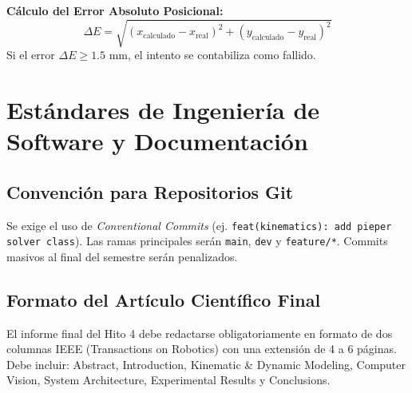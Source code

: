 \documentclass[11pt,a4paper]{article}
\begin{document}
\vspace{0.3cm}
\begin{center}
\end{center}

\vspace{0.3cm}
\noindent \textbf{Cálculo del Error Absoluto Posicional:}
$$ \Delta E = \sqrt{(x_{\text{calculado}} - x_{\text{real}})^2 + (y_{\text{calculado}} - y_{\text{real}})^2} $$
Si el error $\Delta E \ge 1.5\text{ mm}$, el intento se contabiliza como fallido.

\section{Estándares de Ingeniería de Software y Documentación}
\subsection*{Convención para Repositorios Git}
Se exige el uso de \textit{Conventional Commits} (ej. \texttt{feat(kinematics): add pieper solver class}). Las ramas principales serán \texttt{main}, \texttt{dev} y \texttt{feature/*}. Commits masivos al final del semestre serán penalizados.

\subsection*{Formato del Artículo Científico Final}
El informe final del Hito 4 debe redactarse obligatoriamente en formato de dos columnas IEEE (Transactions on Robotics) con una extensión de 4 a 6 páginas. Debe incluir: Abstract, Introduction, Kinematic \& Dynamic Modeling, Computer Vision, System Architecture, Experimental Results y Conclusions.
\end{document}
